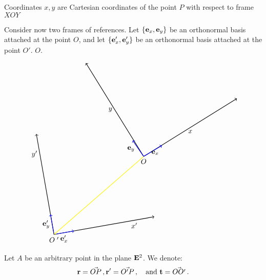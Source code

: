 \documentclass[12pt]{article}
\numberwithin{equation}{section}
\begin{document}
Coordinates $x,y$ are Cartesian coordinates of the point
$P$ with respect to frame  $XOY$


\m

 Consider now two frames of references.
Let $\{{\bf e}_x,{\bf e}_y\}$ be an orthonormal basis attached at 
the point
 $O$, and let
$\{{\bf e}'_x,{\bf e}'_y\}$ be an orthonormal basis attached at 
the point  $O'$.
 $O$.

\begin{equation*}
\begin{tikzpicture} [rotate=10]
\draw 
[ <-> , thick] 
(5,0)--(0,0)--(0,5);

\draw [thick, ->,blue] (0,0)--(1,0);
\node [below] at (0.5,0) {$\e'_x$};

\draw [thick, ->,blue] (0,0)--(0,1);
\node [left] at (0,0.5) {$\e'_y$};

\node [left] at (0,4) {$y'$};
\node [below] at (4,0) {$x'$};

\node [below] at (0,0) {$O^{\,\,\prime}$};

\draw 
[ <-> , thick] 
(3,8)--(5,3)--(10,5);


\draw [thick, ->,blue] (5,3)--(170pt,96pt);
\node [below] at (160pt,94pt) {$\e_x$};


\draw [thick, ->,blue] (5,3)--(131pt,110pt);
\node [left] at (135pt, 97pt) {$\e_y$};


\node [left] at (4,5.5) {$y$};
\node [below] at (7.5,4) {$x$};
\node [below] at (5,3) {$O$};


\draw [thick, yellow,->] (5,3)--(0,0);




\end{tikzpicture}
\end{equation*}


Let $A$ be an arbitrary point in the plane
${\bf E}^2$.  We denote:
     $$
{\bf r}=\vec {OP}\,,
{\bf r}'=\vec {O'P}\,,\quad {\rm and}\,\,
{\bf t}=\vec {OO'}\,.
       $$ 
\end{document}
